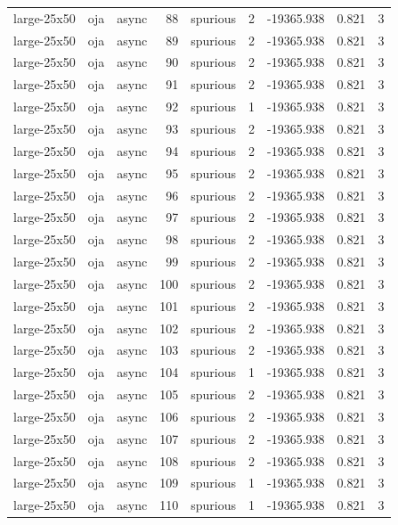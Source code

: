 \begin{tabular}{lllrlrrrr}
large-25x50 & oja & async & 88 & spurious & 2 & -19365.938 & 0.821 & 3 \\
large-25x50 & oja & async & 89 & spurious & 2 & -19365.938 & 0.821 & 3 \\
large-25x50 & oja & async & 90 & spurious & 2 & -19365.938 & 0.821 & 3 \\
large-25x50 & oja & async & 91 & spurious & 2 & -19365.938 & 0.821 & 3 \\
large-25x50 & oja & async & 92 & spurious & 1 & -19365.938 & 0.821 & 3 \\
large-25x50 & oja & async & 93 & spurious & 2 & -19365.938 & 0.821 & 3 \\
large-25x50 & oja & async & 94 & spurious & 2 & -19365.938 & 0.821 & 3 \\
large-25x50 & oja & async & 95 & spurious & 2 & -19365.938 & 0.821 & 3 \\
large-25x50 & oja & async & 96 & spurious & 2 & -19365.938 & 0.821 & 3 \\
large-25x50 & oja & async & 97 & spurious & 2 & -19365.938 & 0.821 & 3 \\
large-25x50 & oja & async & 98 & spurious & 2 & -19365.938 & 0.821 & 3 \\
large-25x50 & oja & async & 99 & spurious & 2 & -19365.938 & 0.821 & 3 \\
large-25x50 & oja & async & 100 & spurious & 2 & -19365.938 & 0.821 & 3 \\
large-25x50 & oja & async & 101 & spurious & 2 & -19365.938 & 0.821 & 3 \\
large-25x50 & oja & async & 102 & spurious & 2 & -19365.938 & 0.821 & 3 \\
large-25x50 & oja & async & 103 & spurious & 2 & -19365.938 & 0.821 & 3 \\
large-25x50 & oja & async & 104 & spurious & 1 & -19365.938 & 0.821 & 3 \\
large-25x50 & oja & async & 105 & spurious & 2 & -19365.938 & 0.821 & 3 \\
large-25x50 & oja & async & 106 & spurious & 2 & -19365.938 & 0.821 & 3 \\
large-25x50 & oja & async & 107 & spurious & 2 & -19365.938 & 0.821 & 3 \\
large-25x50 & oja & async & 108 & spurious & 2 & -19365.938 & 0.821 & 3 \\
large-25x50 & oja & async & 109 & spurious & 1 & -19365.938 & 0.821 & 3 \\
large-25x50 & oja & async & 110 & spurious & 1 & -19365.938 & 0.821 & 3 \\

\end{tabular}

